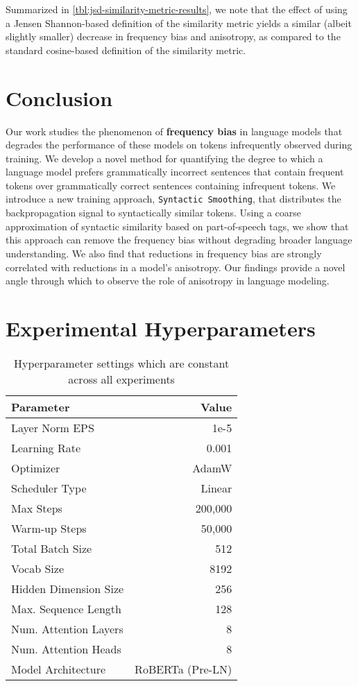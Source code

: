 Summarized in \cref{tbl:jsd-similarity-metric-results}, we note that the effect of using a Jensen Shannon-based definition of the similarity metric yields a similar (albeit slightly smaller) decrease in frequency bias and anisotropy, as compared to the standard cosine-based definition of the similarity metric.   
\section{Conclusion}

Our work studies the phenomenon of \textbf{frequency bias} in language models that degrades the performance of these models on tokens infrequently observed during training. We develop a novel method for quantifying the degree to which a language model prefers grammatically incorrect sentences that contain frequent tokens over grammatically correct sentences containing infrequent tokens.  We introduce a new training approach, \texttt{Syntactic Smoothing}, that distributes the backpropagation signal to syntactically similar tokens. Using a coarse approximation of syntactic similarity based on part-of-speech tags, we show that this approach can remove the frequency bias without degrading broader language understanding. We also find that reductions in frequency bias are strongly correlated with reductions in a model's anisotropy. Our findings provide a novel angle through which to observe the role of anisotropy in language modeling. 

\section{Experimental Hyperparameters}
\label{section:appendix-hyperparameters}
\begin{table}[h!]
    \centering
    \small
    \begin{tabular}{l|r}
        \toprule
             Parameter & Value \\
        \midrule
             Layer Norm EPS& 1e-5 \\
             Learning Rate & 0.001 \\
             Optimizer & AdamW \\
             Scheduler Type & Linear\\
             Max Steps & 200,000 \\
             Warm-up Steps & 50,000 \\
             Total Batch Size & 512 \\
             Vocab Size & 8192 \\
             Hidden Dimension Size & 256 \\
             Max. Sequence Length & 128 \\
             Num. Attention Layers & 8 \\
             Num. Attention Heads & 8 \\
             Model Architecture & RoBERTa (Pre-LN) \\
        \bottomrule
    \end{tabular}
    \caption{Hyperparameter settings which are constant across all experiments}
    \label{tbl:appendix_hyperparams}
\end{table}

